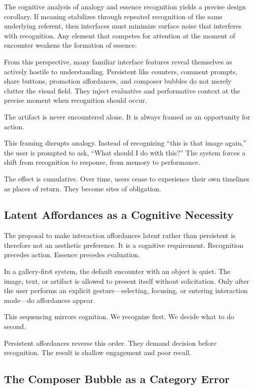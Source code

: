 \documentclass[11pt,oneside]{article}
\begin{document}
The cognitive analysis of analogy and essence recognition yields a precise design corollary. If meaning stabilizes through repeated recognition of the same underlying referent, then interfaces must minimize surface noise that interferes with recognition. Any element that competes for attention at the moment of encounter weakens the formation of essence.

From this perspective, many familiar interface features reveal themselves as actively hostile to understanding. Persistent like counters, comment prompts, share buttons, promotion affordances, and composer bubbles do not merely clutter the visual field. They inject evaluative and performative context at the precise moment when recognition should occur.

The artifact is never encountered alone. It is always framed as an opportunity for action.

This framing disrupts analogy. Instead of recognizing “this is that image again,” the user is prompted to ask, “What should I do with this?” The system forces a shift from recognition to response, from memory to performance.

The effect is cumulative. Over time, users cease to experience their own timelines as places of return. They become sites of obligation.

\subsection{Latent Affordances as a Cognitive Necessity}

The proposal to make interaction affordances latent rather than persistent is therefore not an aesthetic preference. It is a cognitive requirement. Recognition precedes action. Essence precedes evaluation.

In a gallery-first system, the default encounter with an object is quiet. The image, text, or artifact is allowed to present itself without solicitation. Only after the user performs an explicit gesture—selecting, focusing, or entering interaction mode—do affordances appear.

This sequencing mirrors cognition. We recognize first. We decide what to do second.

Persistent affordances reverse this order. They demand decision before recognition. The result is shallow engagement and poor recall.

\subsection{The Composer Bubble as a Category Error}
\end{document}
